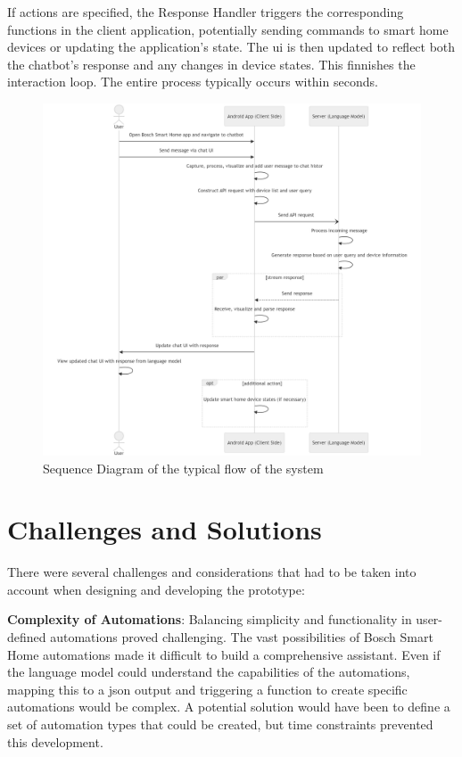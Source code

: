 If actions are specified, the Response Handler triggers the corresponding functions in the client application, potentially sending commands to smart home devices or updating the application's state. The \gls{ui} is then updated to reflect both the chatbot's response and any changes in device states.
This finnishes the interaction loop. The entire process typically occurs within seconds.

\begin{figure}[h]
    \centering
    \captionsetup{justification=centering}
    \includegraphics[width=\textwidth]{graphics/sequencedia.png}
    \caption{Sequence Diagram of the typical flow of the system}
    \label{fig:sequencedia}
\end{figure}

\section{Challenges and Solutions}
\label{sec:challenges-solutions}
There were several challenges and considerations that had to be taken into account when designing and developing the prototype:

\textbf{Complexity of Automations}: Balancing simplicity and functionality in user-defined automations proved challenging. The vast possibilities of Bosch Smart Home automations made it difficult to build a comprehensive assistant. Even if the language model could understand the capabilities of the automations, mapping this to a \gls{json} output and triggering a function to create specific automations would be complex. A potential solution would have been to define a set of automation types that could be created, but time constraints prevented this development.
    
